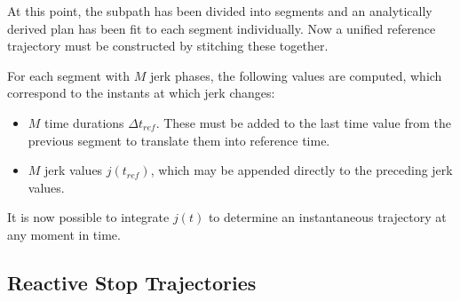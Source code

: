 \documentclass[letterpaper, 10 pt, conference]{ieeeconf}  %
\begin{document}
At this point, the subpath has been divided into segments and an analytically derived plan has been fit to each segment individually.
Now a unified reference trajectory must be constructed by stitching these together.

For each segment with $M$ jerk phases, the following values are computed, which correspond to the instants at which jerk changes:
\begin{itemize}
  \item $M$ time durations $\Delta t_{ref}$. These must be added to the last time value from the previous segment to translate them into reference time.
  \item $M$ jerk values $j(t_{ref})$, which may be appended directly to the preceding jerk values.
\end{itemize}
It is now possible to integrate $j(t)$ to determine an instantaneous trajectory at any moment in time.




\subsection{Reactive Stop Trajectories} \label{sec:reactivestoptrajectory}
\end{document}
